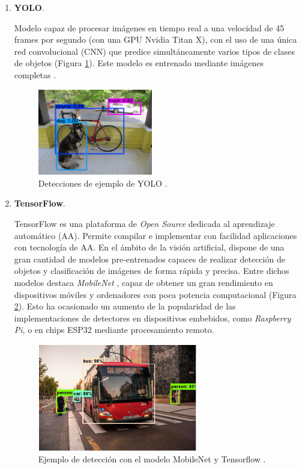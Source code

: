 \begin{enumerate}
	\item \textbf{YOLO}.
	
	Modelo capaz de procesar imágenes en tiempo real a una velocidad de 45 frames por segundo (con una GPU Nvidia Titan X), con el uso de una única red convolucional (CNN) que predice simultáneamente varios tipos de clases de objetos (Figura \ref{fig:yoloExample}). Este modelo es entrenado mediante imágenes completas \cite{YOLO}.
	
	\begin{figure}[htp]
		\centering
		\includegraphics[width=5cm]{imagenes/yolo_example.jpg}
		\caption{Detecciones de ejemplo de YOLO \cite{YOLO}.}
		\label{fig:yoloExample}
	\end{figure}
	
	\item \textbf{TensorFlow}.
	
	TensorFlow es una plataforma de \textit{Open Source} dedicada al aprendizaje automático (AA). Permite compilar e implementar con facilidad aplicaciones con tecnología de AA. En el ámbito de la visión artificial, dispone de una gran cantidad de modelos pre-entrenados capaces de realizar detección de objetos y clasificación de imágenes de forma rápida y precisa. Entre dichos modelos destaca \textit{MobileNet} \cite{mobilenet1}, capaz de obtener un gran rendimiento en dispositivos móviles y ordenadores con poca potencia computacional (Figura \ref{fig:mobilenetExample}). Esto ha ocasionado un aumento de la popularidad de las implementaciones de detectores en dispositivos embebidos, como \textit{Raspberry Pi}, o en chips ESP32 mediante procesamiento remoto.
	
	\begin{figure}[htp]
		\centering
		\includegraphics[width=7cm]{imagenes/mobilenet_example.png}
		\caption[Ejemplo de detección con el modelo MobileNet y Tensorflow.]{Ejemplo de detección con el modelo MobileNet y Tensorflow \cite{mobilenet1}.}
		\label{fig:mobilenetExample}
	\end{figure}
	

\end{enumerate}
